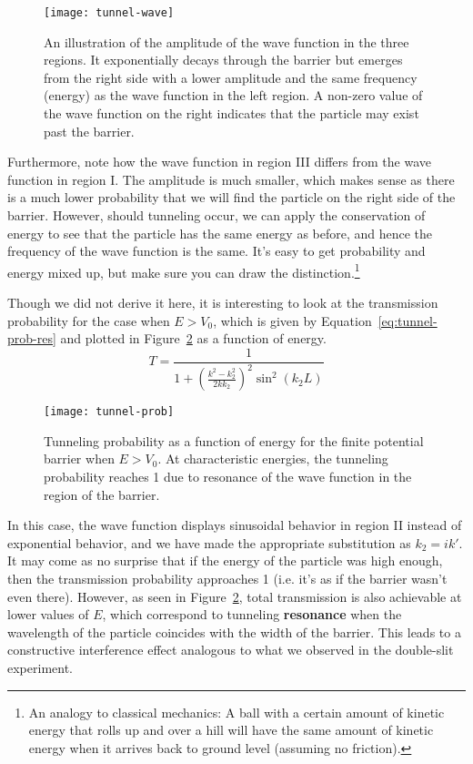 \begin{figure}[!h]
	\centering
	\texttt{[image: tunnel-wave]}
	\caption{An illustration of the amplitude of the wave function in the three regions. It exponentially decays through the barrier but emerges from the right side with a lower amplitude and the same frequency (energy) as the wave function in the left region. A non-zero value of the wave function on the right indicates that the particle may exist past the barrier.}
	\label{fig:tunnel-wave}
\end{figure}

Furthermore, note how the wave function in region III differs from the wave function in region I. The amplitude is much smaller, which makes sense as there is a much lower probability that we will find the particle on the right side of the barrier. However, should tunneling occur, we can apply the conservation of energy to see that the particle has the same energy as before, and hence the frequency of the wave function is the same. It's easy to get probability and energy mixed up, but make sure you can draw the distinction.\footnote{An analogy to classical mechanics: A ball with a certain amount of kinetic energy that rolls up and over a hill will have the same amount of kinetic energy when it arrives back to ground level (assuming no friction).} \par 

Though we did not derive it here, it is interesting to look at the transmission probability for the case when $E > V_0$, which is given by Equation~\ref{eq:tunnel-prob-res} and plotted in Figure~\ref{fig:tunnel-prob} as a function of energy.
\begin{equation}
	\boxed{T = \frac{1}{1 + \left(\frac{k^2-k_2^2}{2kk_2}\right)^2 \sin^2(k_2L)}} \label{eq:tunnel-prob-res}
\end{equation}

\begin{figure}[!h]
	\centering
	\texttt{[image: tunnel-prob]}
	\caption{Tunneling probability as a function of energy for the finite potential barrier when $E > V_0$. At characteristic energies, the tunneling probability reaches 1 due to resonance of the wave function in the region of the barrier.}
	\label{fig:tunnel-prob}
\end{figure}

In this case, the wave function displays sinusoidal behavior in region II instead of exponential behavior, and we have made the appropriate substitution as $k_2=ik'$. It may come as no surprise that if the energy of the particle was high enough, then the transmission probability approaches 1 (i.e. it's as if the barrier wasn't even there). However, as seen in Figure~\ref{fig:tunnel-prob}, total transmission is also achievable at lower values of $E$, which correspond to tunneling \textbf{resonance} when the wavelength of the particle coincides with the width of the barrier. This leads to a constructive interference effect analogous to what we observed in the double-slit experiment.

